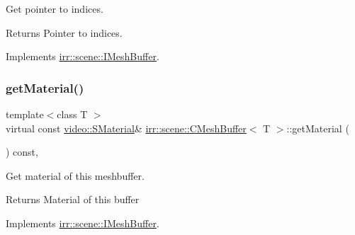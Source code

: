 Get pointer to indices. 

\begin{DoxyReturn}{Returns}
Pointer to indices. 
\end{DoxyReturn}


Implements \hyperlink{classirr_1_1scene_1_1IMeshBuffer_a3d33a561023314677361e30cf07ae429}{irr\+::scene\+::\+I\+Mesh\+Buffer}.

\mbox{\label{classirr_1_1scene_1_1CMeshBuffer_a3e971800b0fc1a67134f839309589e43}} 
\subsubsection{\texorpdfstring{get\+Material()}{getMaterial()}\hspace{0.1cm}{\footnotesize\ttfamily [1/4]}}
{\footnotesize\ttfamily template$<$class T $>$ \\
virtual const \hyperlink{classirr_1_1video_1_1SMaterial}{video\+::\+S\+Material}\& \hyperlink{classirr_1_1scene_1_1CMeshBuffer}{irr\+::scene\+::\+C\+Mesh\+Buffer}$<$ T $>$\+::get\+Material (\begin{DoxyParamCaption}{ }\end{DoxyParamCaption}) const\hspace{0.3cm}{\ttfamily [inline]}, {\ttfamily [virtual]}}



Get material of this meshbuffer. 

\begin{DoxyReturn}{Returns}
Material of this buffer 
\end{DoxyReturn}


Implements \hyperlink{classirr_1_1scene_1_1IMeshBuffer_a341c1da2fd0cd556a15aab06d07dbbaa}{irr\+::scene\+::\+I\+Mesh\+Buffer}.

\mbox{\label{classirr_1_1scene_1_1CMeshBuffer_a3e971800b0fc1a67134f839309589e43}} 
